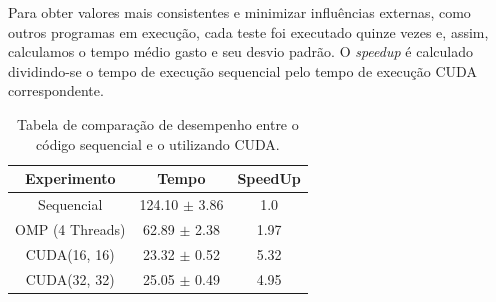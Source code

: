 \documentclass[12pt]{article}
\begin{document}
Para obter valores mais consistentes e minimizar influências externas, como
outros programas em execução, cada teste foi executado quinze vezes e, assim,
calculamos o tempo médio gasto e seu desvio padrão. O \textit{speedup} é
calculado dividindo-se o tempo de execução sequencial pelo tempo de execução
CUDA correspondente.

\begin{table}[ht]
  \centering
  \caption{Tabela de comparação de desempenho entre o código sequencial e o
    utilizando CUDA.}\label{tab:Resultados}
  \vspace{0.3cm}
  \begin{tabular}{||c c c||}
    \hline
    Experimento     & Tempo             & SpeedUp \\ [0.5ex]
    \hline\hline
    Sequencial      & 124.10 $\pm$ 3.86 & 1.0     \\
    \hline
    OMP (4 Threads) & 62.89 $\pm$ 2.38  & 1.97    \\
    \hline
    CUDA(16, 16)    & 23.32 $\pm$ 0.52  & 5.32    \\
    \hline
    CUDA(32, 32)    & 25.05 $\pm$ 0.49  & 4.95    \\
    \hline
  \end{tabular}
\end{table}
\end{document}
